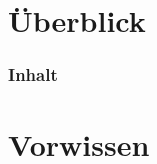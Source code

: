\documentclass[]{beamer}
\begin{document}




\section*{Überblick}
\begin{frame}
    \frametitle{Inhalt}
    \tableofcontents
\end{frame}


\section{Vorwissen}


\end{document}
